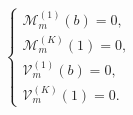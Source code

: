 \documentclass{jfm}
\begin{document}
\begin{itemize}
\begin{eqnarray}\left\{
\begin{array}{l}
\displaystyle \mathcal{M}_m^{(1)} (b) = 0, \\
\displaystyle \mathcal{M}_m^{(K)} (1) = 0, \\
\displaystyle \mathcal{V}_m^{(1)} (b) = 0, \\ 
\displaystyle  \mathcal{V}_m^{(K)} (1)= 0.  
\end{array}\right.
\end{eqnarray}


\end{itemize}
%
%


%
%

%
%

\end{document}
